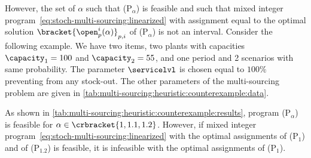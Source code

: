 However, the set of $\alpha$ such that (P$_{\alpha}$) is feasible and such that mixed integer program~\eqref{eq:stoch-multi-sourcing:linearized} with assignment equal to the optimal solution $\bracket{\open_p^i(\alpha)}_{p,i}$ of (P$_{\alpha}$) is not an interval.
Consider the following example.
We have two items, two plants with capacities $\capacity_1=100$ and $\capacity_2=55$, and one period and 2 scenarios with same probability.
The parameter $\servicelvl$ is chosen equal to $100\%$ preventing from any stock-out.
The other parameters of the multi-sourcing problem are given in \cref{tab:multi-sourcing:heuristic:counterexample:data}.
\begin{table}[h]
\hfill
{}
\hfill
{}
\caption{Parameters of the counterexample}
\label{tab:multi-sourcing:heuristic:counterexample:data}
\end{table}

As shown in \cref{tab:multi-sourcing:heuristic:counterexample:results}, program (P$_{\alpha}$) is feasible for $\alpha\in\crbracket{1,1.1,1.2}$. However, if mixed integer program~\eqref{eq:stoch-multi-sourcing:linearized} with the optimal assignments of (P$_{1}$) and of (P$_{1.2}$) is feasible, it is infeasible with the optimal assignments of (P$_{1}$).

